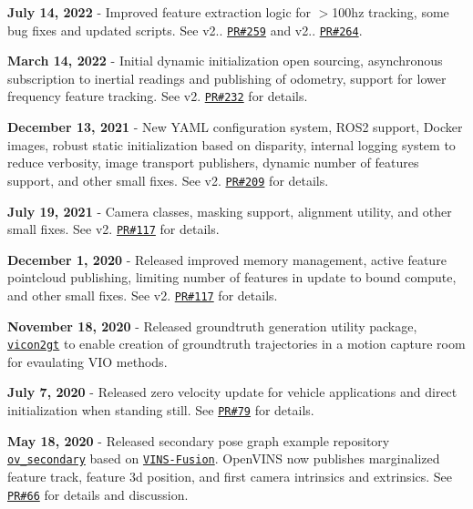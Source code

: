 \begin{DoxyItemize}
\item {\bfseries July 14, 2022} -\/ Improved feature extraction logic for $>$100hz tracking, some bug fixes and updated scripts. See v2.. \href{https://github.com/rpng/open_vins/pull/259}{\tt PR\#259} and v2.. \href{https://github.com/rpng/open_vins/pull/264}{\tt PR\#264}.
\item {\bfseries March 14, 2022} -\/ Initial dynamic initialization open sourcing, asynchronous subscription to inertial readings and publishing of odometry, support for lower frequency feature tracking. See v2. \href{https://github.com/rpng/open_vins/pull/232}{\tt PR\#232} for details.
\item {\bfseries December 13, 2021} -\/ New Y\+A\+ML configuration system, R\+O\+S2 support, Docker images, robust static initialization based on disparity, internal logging system to reduce verbosity, image transport publishers, dynamic number of features support, and other small fixes. See v2. \href{https://github.com/rpng/open_vins/pull/209}{\tt PR\#209} for details.
\item {\bfseries July 19, 2021} -\/ Camera classes, masking support, alignment utility, and other small fixes. See v2. \href{https://github.com/rpng/open_vins/pull/186}{\tt PR\#117} for details.
\item {\bfseries December 1, 2020} -\/ Released improved memory management, active feature pointcloud publishing, limiting number of features in update to bound compute, and other small fixes. See v2. \href{https://github.com/rpng/open_vins/pull/117}{\tt PR\#117} for details.
\item {\bfseries November 18, 2020} -\/ Released groundtruth generation utility package, \href{https://github.com/rpng/vicon2gt}{\tt vicon2gt} to enable creation of groundtruth trajectories in a motion capture room for evaulating V\+IO methods.
\item {\bfseries July 7, 2020} -\/ Released zero velocity update for vehicle applications and direct initialization when standing still. See \href{https://github.com/rpng/open_vins/pull/79}{\tt PR\#79} for details.
\item {\bfseries May 18, 2020} -\/ Released secondary pose graph example repository \href{https://github.com/rpng/ov_secondary}{\tt ov\+\_\+secondary} based on \href{https://github.com/HKUST-Aerial-Robotics/VINS-Fusion}{\tt V\+I\+N\+S-\/\+Fusion}. Open\+V\+I\+NS now publishes marginalized feature track, feature 3d position, and first camera intrinsics and extrinsics. See \href{https://github.com/rpng/open_vins/pull/66}{\tt PR\#66} for details and discussion.

\end{DoxyItemize}
